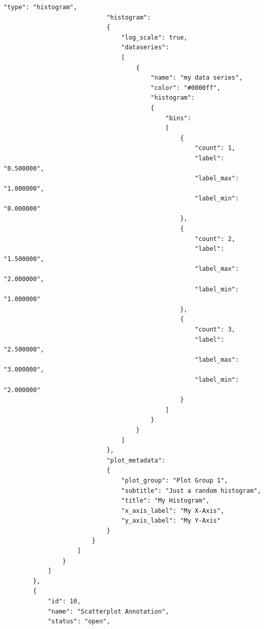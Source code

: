 \begin{lstlisting}[basicstyle=\small\ttfamily]
                            "type": "histogram",
                            "histogram": 
                            {
                                "log_scale": true,
                                "dataseries": 
                                [
                                    {
                                        "name": "my data series",
                                        "color": "#0000ff", 
                                        "histogram": 
                                        {
                                            "bins": 
                                            [
                                                {
                                                    "count": 1,           
                                                    "label": "0.500000",   
                                                    "label_max": "1.000000",
                                                    "label_min": "0.000000"
                                                },
                                                {
                                                    "count": 2,
                                                    "label": "1.500000",
                                                    "label_max": "2.000000",
                                                    "label_min": "1.000000"
                                                },
                                                {
                                                    "count": 3,
                                                    "label": "2.500000",
                                                    "label_max": "3.000000",
                                                    "label_min": "2.000000"
                                                }
                                            ]
                                        }
                                    }
                                ]
                            },
                            "plot_metadata": 
                            {
                                "plot_group": "Plot Group 1",
                                "subtitle": "Just a random histogram",
                                "title": "My Histogram",
                                "x_axis_label": "My X-Axis",
                                "y_axis_label": "My Y-Axis"
                            }
                        }         
                    ]
                }
            ]
        },
        {
            "id": 10,
            "name": "Scatterplot Annotation",
            "status": "open",

\end{lstlisting}
